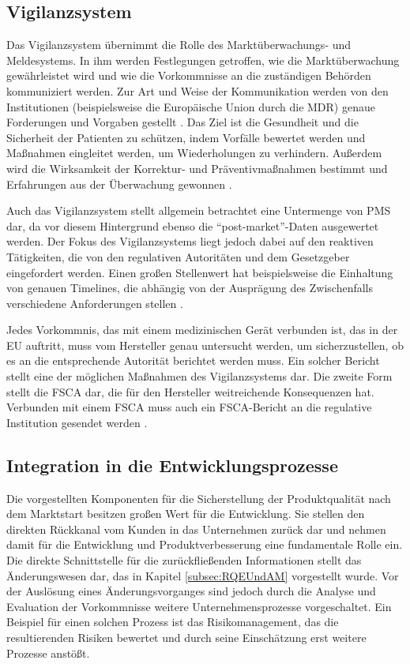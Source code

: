 \documentclass[a4paper,12pt]{report}
\begin{document}
\subsection{Vigilanzsystem}\label{subsec:Vigilance}
Das Vigilanzsystem übernimmt die Rolle des Marktüberwachungs- und Meldesystems. In ihm werden Festlegungen getroffen, wie die Marktüberwachung gewährleistet wird und wie die Vorkommnisse an die zuständigen Behörden kommuniziert werden. Zur Art und Weise der Kommunikation werden von den Institutionen (beispielsweise die Europäische Union durch die MDR) genaue Forderungen und Vorgaben gestellt \citep[vgl.][]{Johner2017}. Das Ziel ist die Gesundheit und die Sicherheit der Patienten zu schützen, indem Vorfälle bewertet werden und Maßnahmen eingleitet werden, um Wiederholungen zu verhindern. Außerdem wird die Wirksamkeit der Korrektur- und Präventivmaßnahmen bestimmt und Erfahrungen aus der Überwachung gewonnen \citep[vgl.][S. 1]{Pugh2017}.

Auch das Vigilanzsystem stellt allgemein betrachtet eine Untermenge von PMS dar, da vor diesem Hintergrund ebenso die "`post-market"'-Daten ausgewertet werden. Der Fokus des Vigilanzsystems liegt jedoch dabei auf den reaktiven Tätigkeiten, die von den regulativen Autoritäten und dem Gesetzgeber eingefordert werden. Einen großen Stellenwert hat beispielsweise die Einhaltung von genauen Timelines, die abhängig von der Ausprägung des Zwischenfalls verschiedene Anforderungen stellen \citep[vgl.][S. 1]{Pugh2017}.

Jedes Vorkommnis, das mit einem medizinischen Gerät verbunden ist, das in der EU auftritt, muss vom Hersteller genau untersucht werden, um sicherzustellen, ob es an die entsprechende Autorität berichtet werden muss. Ein solcher Bericht stellt eine der möglichen Maßnahmen des Vigilanzsystems dar. Die zweite Form stellt die \ac{FSCA} dar, die für den Hersteller weitreichende Konsequenzen hat. Verbunden mit einem \ac{FSCA} muss auch ein FSCA-Bericht an die regulative Institution gesendet werden \citep[vgl.][S. 1f.]{Loh2017}.
\subsection{Integration in die Entwicklungsprozesse}\label{subsec:IntegrationInDevProzesse}
Die vorgestellten Komponenten für die Sicherstellung der Produktqualität nach dem Marktstart besitzen großen Wert für die Entwicklung. Sie stellen den direkten Rückkanal vom Kunden in das Unternehmen zurück dar und nehmen damit für die Entwicklung und Produktverbesserung eine fundamentale Rolle ein. Die direkte Schnittstelle für die zurückfließenden Informationen stellt das Änderungswesen dar, das in Kapitel \ref{subsec:RQEUndAM} vorgestellt wurde. Vor der Auslösung eines Änderungsvorganges sind jedoch durch die Analyse und Evaluation der Vorkommnisse weitere Unternehmensprozesse vorgeschaltet. Ein Beispiel für einen solchen Prozess ist das Risikomanagement, das die resultierenden Risiken bewertet und durch seine Einschätzung erst weitere Prozesse anstößt.
\end{document}
